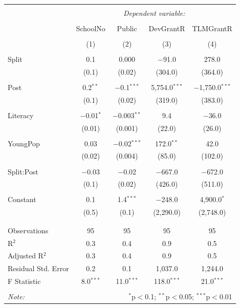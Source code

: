 \documentclass[12pt, a4paper]{article}
\begin{document}
\begin{table}[!htbp] \centering 
  \caption{} 
  \label{} 
\begin{tabular}{@{\extracolsep{5pt}}lcccc} 
\\[-1.8ex]\hline 
\hline \\[-1.8ex] 
 & \multicolumn{4}{c}{\textit{Dependent variable:}} \\ 
\cline{2-5} 
\\[-1.8ex] & SchoolNo & Public & DevGrantR & TLMGrantR \\ 
\\[-1.8ex] & (1) & (2) & (3) & (4)\\ 
\hline \\[-1.8ex] 
 Split & 0.1 & 0.000 & $-$91.0 & 278.0 \\ 
  & (0.1) & (0.02) & (304.0) & (364.0) \\ 
  & & & & \\ 
 Post & 0.2$^{**}$ & $-$0.1$^{***}$ & 5,754.0$^{***}$ & $-$1,750.0$^{***}$ \\ 
  & (0.1) & (0.02) & (319.0) & (383.0) \\ 
  & & & & \\ 
 Literacy & $-$0.01$^{*}$ & $-$0.003$^{**}$ & 9.4 & $-$36.0 \\ 
  & (0.01) & (0.001) & (22.0) & (26.0) \\ 
  & & & & \\ 
 YoungPop & 0.03 & $-$0.02$^{***}$ & 172.0$^{**}$ & 42.0 \\ 
  & (0.02) & (0.004) & (85.0) & (102.0) \\ 
  & & & & \\ 
 Split:Post & $-$0.03 & $-$0.02 & $-$667.0 & $-$672.0 \\ 
  & (0.1) & (0.02) & (426.0) & (511.0) \\ 
  & & & & \\ 
 Constant & 0.1 & 1.4$^{***}$ & $-$248.0 & 4,900.0$^{*}$ \\ 
  & (0.5) & (0.1) & (2,290.0) & (2,748.0) \\ 
  & & & & \\ 
\hline \\[-1.8ex] 
Observations & 95 & 95 & 95 & 95 \\ 
R$^{2}$ & 0.3 & 0.4 & 0.9 & 0.5 \\ 
Adjusted R$^{2}$ & 0.3 & 0.4 & 0.9 & 0.5 \\ 
Residual Std. Error & 0.2 & 0.1 & 1,037.0 & 1,244.0 \\ 
F Statistic & 8.0$^{***}$ & 11.0$^{***}$ & 118.0$^{***}$ & 21.0$^{***}$ \\ 
\hline 
\hline \\[-1.8ex] 
\textit{Note:}  & \multicolumn{4}{r}{$^{*}$p$<$0.1; $^{**}$p$<$0.05; $^{***}$p$<$0.01} \\ 
\end{tabular} 
\end{table} %
\end{document}
